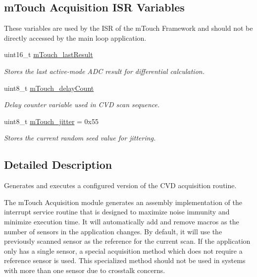 \subsection*{m\+Touch Acquisition I\+S\+R Variables}
\label{_amgrpd8ec0cfe8287733f0d3c2a715e39ed21}%
These variables are used by the I\+S\+R of the m\+Touch Framework and should not be directly accessed by the main loop application. \begin{DoxyCompactItemize}
\item 
uint16\+\_\+t \hyperlink{group___acquisition_ga6890b3a94dbdd045d66ec2b025cddda6}{m\+Touch\+\_\+last\+Result}
\begin{DoxyCompactList}\small\item\em Stores the last active-\/mode A\+D\+C result for differential calculation. \end{DoxyCompactList}\item 
uint8\+\_\+t \hyperlink{group___acquisition_gaf6d2f71af7a6dfd8571cbd141c40053e}{m\+Touch\+\_\+delay\+Count}
\begin{DoxyCompactList}\small\item\em Delay counter variable used in C\+V\+D scan sequence. \end{DoxyCompactList}\item 
uint8\+\_\+t \hyperlink{group___acquisition_ga800eae7ce7292a55c5d60975179ea26a}{m\+Touch\+\_\+jitter} = 0x55
\begin{DoxyCompactList}\small\item\em Stores the current random seed value for jittering. \end{DoxyCompactList}\end{DoxyCompactItemize}


\subsection{Detailed Description}
Generates and executes a configured version of the C\+V\+D acquisition routine. 

The m\+Touch Acquisition module generates an assembly implementation of the interrupt service routine that is designed to maximize noise immunity and minimize execution time. It will automatically add and remove macros as the number of sensors in the application changes. By default, it will use the previously scanned sensor as the reference for the current scan. If the application only has a single sensor, a special acquisition method which does not require a reference sensor is used. This specialized method should not be used in systems with more than one sensor due to crosstalk concerns. 

